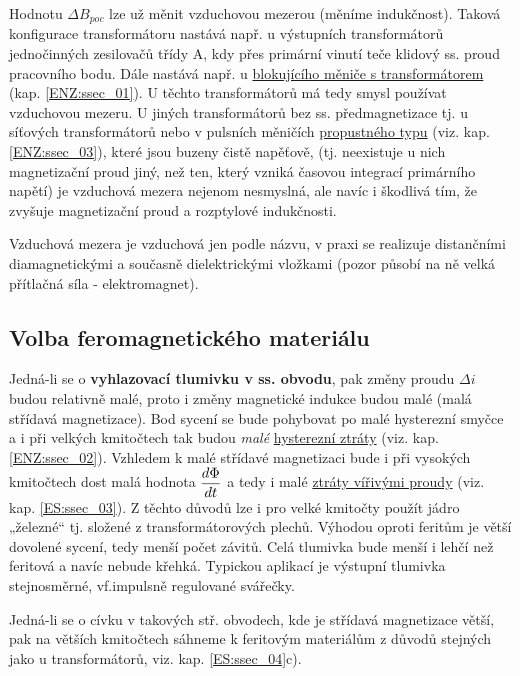       Hodnotu \(\Delta B_{poc}\) lze už měnit vzduchovou mezerou (měníme indukčnost). Taková 
      konfigurace transformátoru nastává např. u výstupních transformátorů jednočinných zesilovačů 
      třídy A, kdy přes primární vinutí teče klidový ss. proud pracovního bodu. Dále nastává např. 
      u \hyperlink{ENZ:ssec_01}{blokujícího měniče s transformátorem} (kap. \ref{ENZ:ssec_01}). U 
      těchto transformátorů má tedy smysl používat vzduchovou mezeru. U jiných transformátorů bez 
      ss. předmagnetizace tj. u síťových transformátorů nebo v pulsních měničích 
      \hyperlink{ENZ:ssec_03}{propustného typu} (viz. kap. \ref{ENZ:ssec_03}), které jsou buzeny 
      čistě napěťově, (tj. neexistuje u nich magnetizační proud jiný, než ten, který vzniká 
      časovou integrací primárního napětí) je vzduchová mezera nejenom nesmyslná, ale navíc i 
      škodlivá tím, že zvyšuje magnetizační proud a rozptylové indukčnosti.
      
      \begin{note}
        Vzduchová mezera je vzduchová jen podle názvu, v praxi se realizuje distančními
        diamagnetickými a současně dielektrickými vložkami (pozor působí na ně velká přítlačná 
        síla - elektromagnet).
      \end{note}
    
    \subsection{Volba feromagnetického materiálu}
      Jedná-li se o \textbf{vyhlazovací tlumivku v ss. obvodu}, pak změny proudu \(\Delta i\) 
      budou relativně malé, proto i změny magnetické indukce budou malé (malá střídavá 
      magnetizace). Bod sycení se bude pohybovat po malé hysterezní smyčce a i při velkých 
      kmitočtech tak budou \emph{malé} \hyperlink{ENZ:ssec_02}{hysterezní ztráty} (viz. kap. 
      \ref{ENZ:ssec_02}). Vzhledem k malé střídavé magnetizaci bude i při vysokých kmitočtech dost 
      malá hodnota \(\dfrac{d \Phi}{d t}\) a tedy i malé \hyperlink{ES:ssec_03}{ztráty vířivými proudy} 
      (viz. kap. \ref{ES:ssec_03}). Z těchto důvodů lze i pro velké kmitočty použít jádro „železné“ 
      tj. složené z transformátorových plechů. Výhodou oproti feritům je větší dovolené sycení, 
      tedy menší počet závitů. Celá tlumivka bude menší i lehčí než feritová a navíc nebude křehká. 
      Typickou aplikací je výstupní tlumivka stejnosměrné, vf.impulsně regulované svářečky.
      
      Jedná-li se o cívku v takových stř. obvodech, kde je střídavá magnetizace větší, pak na 
      větších kmitočtech sáhneme k feritovým materiálům z důvodů stejných jako u transformátorů, 
      viz. kap. \ref{ES:ssec_04}c).
    
